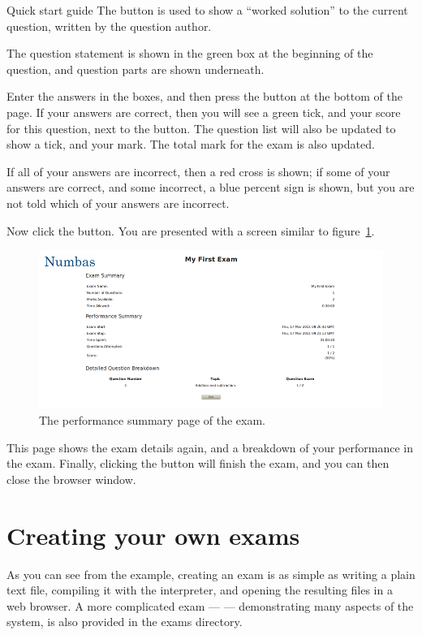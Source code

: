\begin{chapter}{\label{cha:quickstart}Quick start guide}
  The  button is used to show a ``worked solution'' to the
  current question, written by the question author.

  The question statement is shown in the green box at the beginning of the
  question, and question parts are shown underneath.

  Enter the answers in the boxes, and then press the  button
  at the bottom of the page.  If your answers are correct, then you will see a
  green tick, and your score for this question, next to the 
  button.  The question list will also be updated to show a tick, and your
  mark.  The total mark for the exam is also updated.

  If all of your answers are incorrect, then a red cross is shown; if some of
  your answers are correct, and some incorrect, a blue percent sign is shown,
  but you are not told which of your answers are incorrect.

  Now click the  button.  You are presented with a screen
  similar to figure~\ref{fig:example_screen3}.
  \begin{figure}[ht]
    \centering
    \includegraphics[scale=0.5]{fig/example_screen3}
    \caption{\label{fig:example_screen3}
      The performance summary page of the exam.
    }
  \end{figure}
  This page shows the exam details again, and a breakdown of your performance
  in the exam.  Finally, clicking the  button will finish the
  exam, and you can then close the browser window.

  \section{Creating your own exams}
  As you can see from the example, creating an exam is as simple as writing a
  plain text file, compiling it with the  interpreter,
  and opening the resulting files in a web browser.  A more complicated exam
  ---  --- demonstrating many aspects of the system,
  is also provided in the exams directory.


\end{chapter}
